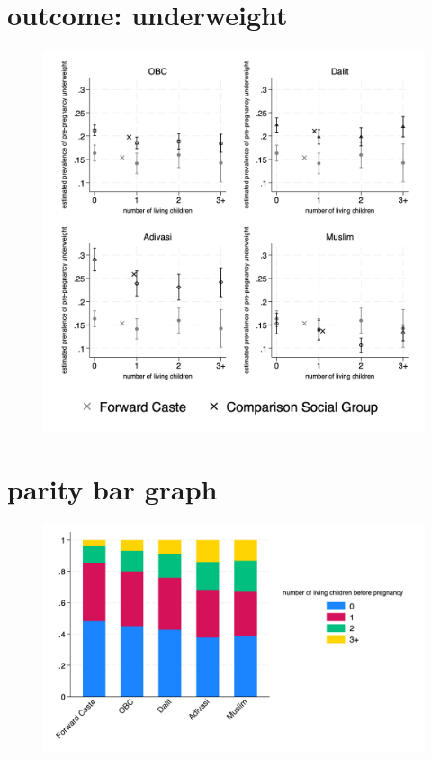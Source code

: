 \documentclass{article}
\begin{document}

\section{outcome: underweight}
\begin{figure}[H]
    \centering
    \includegraphics[width=\textwidth]{figures/prepreg_underweight_combined.png}
\end{figure}

\section{parity bar graph}
\begin{figure}[H]
    \centering
    \includegraphics[width=\textwidth]{figures/stackedbar_parity_socialgroup.png}
\end{figure}
\end{document}
